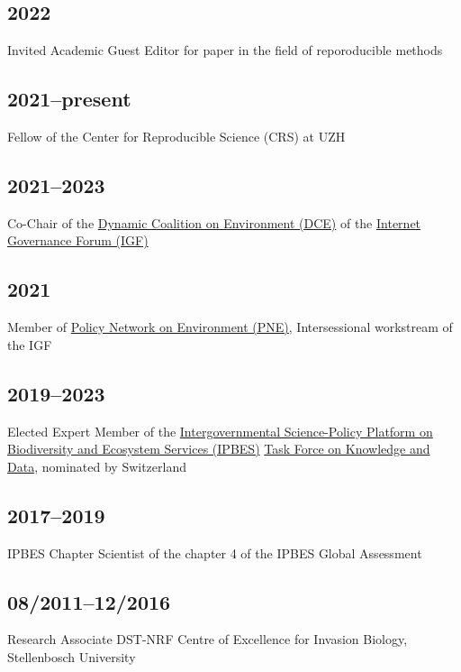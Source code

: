 \documentclass[a4paper]{article}
\begin{document}
\subsection{2022}
Invited Academic Guest Editor for paper in the field of reporoducible methods

\subsection{2021--present}
Fellow of the Center for Reproducible Science (CRS) at UZH

\subsection{2021--2023}

Co-Chair of the \href{https://intgovforum.org/en/content/dynamic-coalition-on-environment-dce}{Dynamic Coalition on Environment (DCE)} of the \href{https://intgovforum.org/en}{Internet Governance Forum (IGF)}

\subsection{2021}

Member of \href{https://www.intgovforum.org/en/content/policy-network-on-environment-pne}{Policy Network on Environment (PNE)}, Intersessional workstream of the IGF

\subsection{2019--2023}

Elected Expert Member of the \href{https://ipbes.net/}{Intergovernmental Science-Policy Platform on Biodiversity and Ecosystem Services (IPBES)} \href{https://ipbes.net/knowledge-data}{Task Force on Knowledge and Data}, nominated by Switzerland

\subsection{2017--2019}

IPBES Chapter Scientist of the chapter 4 of the IPBES Global Assessment

\subsection{08/2011--12/2016}

Research Associate DST-NRF Centre of Excellence for Invasion Biology, Stellenbosch University
\end{document}
